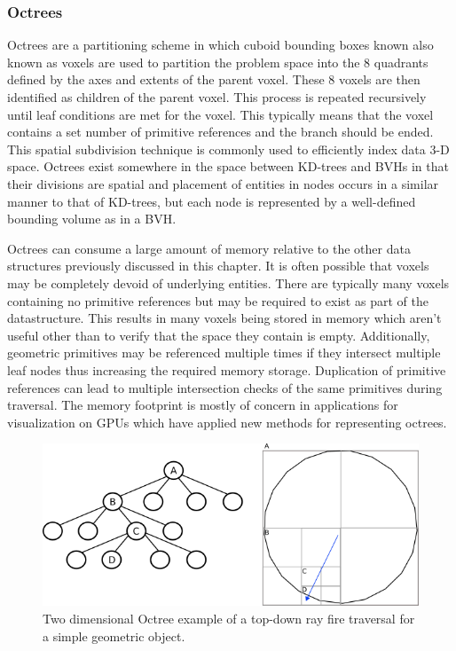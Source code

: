 \documentclass[12pt, a4paper]{article}
\begin{document}
\subsubsection{Octrees}%
\label{sec:octree}
Octrees are a partitioning scheme in which cuboid bounding boxes known also known as voxels are used to partition the problem space into the 8 quadrants defined by the axes and extents of the parent voxel. These 8 voxels are then identified as children of the parent voxel. This process is repeated recursively until leaf conditions are met for the voxel. This typically means that the voxel contains a set number of primitive references and the branch should be ended. This spatial subdivision technique is commonly used to efficiently index data 3-D space.\cite{Glassner_1989} Octrees exist somewhere in the space between KD-trees and BVHs in that their divisions are spatial and placement of entities in nodes occurs in a similar manner to that of KD-trees, but each node is represented by a well-defined bounding volume as in a BVH.

Octrees can consume a large amount of memory relative to the other data structures previously discussed in this chapter. It is often possible that voxels may be completely devoid of underlying entities. There are typically many voxels containing no primitive references but may be required to exist as part of the datastructure. This results in many voxels being stored in memory which aren't useful other than to verify that the space they contain is empty. Additionally, geometric primitives may be referenced multiple times if they intersect multiple leaf nodes thus increasing the required memory storage. Duplication of primitive references can lead to multiple intersection checks of the same primitives during traversal. The memory footprint is mostly of concern in applications for visualization on GPUs which have applied new methods for representing octrees.



\begin{figure}[H]
  \centering
  \includegraphics[scale=0.65]{octree_2d_ex.png}
  \caption{Two dimensional Octree example of a top-down ray fire traversal for a simple geometric object.}
  \label{octree_2d_ex}
\end{figure}
\end{document}
